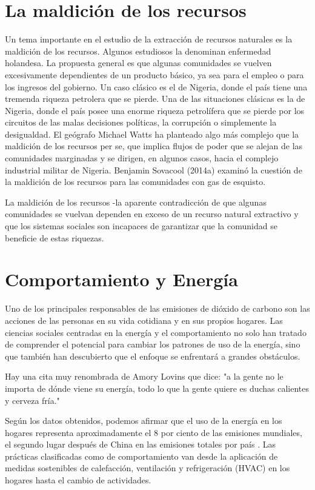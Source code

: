 \documentclass{article}
\begin{document}
\section{La maldición de los recursos}
Un tema importante en el estudio de la extracción de recursos naturales es la maldición de los recursos.
Algunos estudiosos la denominan enfermedad holandesa. La propuesta general es que algunas comunidades se vuelven excesivamente dependientes de un producto básico, ya sea para el empleo o para los ingresos del gobierno. Un caso clásico es el de Nigeria, donde el país tiene una tremenda riqueza petrolera que se pierde.
Una de las situaciones clásicas es la de Nigeria, donde el país posee una enorme riqueza petrolífera que se pierde por los circuitos de las malas decisiones políticas, la corrupción o simplemente la desigualdad. El geógrafo Michael Watts ha planteado algo más complejo que la maldición de los recursos per se, que implica flujos de poder que se alejan de las comunidades marginadas y se dirigen, en algunos casos, hacia el complejo industrial militar de Nigeria. Benjamin Sovacool (2014a) examinó la cuestión de la maldición de los recursos para las comunidades con gas de esquisto.

La maldición de los recursos -la aparente contradicción de que algunas comunidades se vuelvan dependen en exceso de un recurso natural extractivo y que los sistemas sociales son incapaces de garantizar que la comunidad se beneficie de estas riquezas.

\section{Comportamiento y Energía}

Uno de los principales responsables de las emisiones de dióxido de carbono son las acciones de las personas en su vida cotidiana y en sus propios hogares. Las ciencias sociales centradas en la energía y el comportamiento no solo han tratado de comprender el potencial para cambiar los patrones de uso de la energía, sino que también han descubierto que el enfoque se enfrentará a grandes obstáculos.


Hay una cita muy renombrada de Amory Lovins que dice: "a la gente no le importa de dónde viene su energía, todo lo que la gente quiere es duchas calientes y cerveza fría."


Según los datos obtenidos, podemos afirmar que el uso de la energía en los hogares representa aproximadamente el 8 por ciento de las emisiones mundiales, el segundo lugar después de China en las emisiones totales por país . Las prácticas clasificadas como de comportamiento van desde la aplicación de medidas sostenibles de calefacción, ventilación y refrigeración (HVAC) en los hogares hasta el cambio de actividades.
\end{document}
